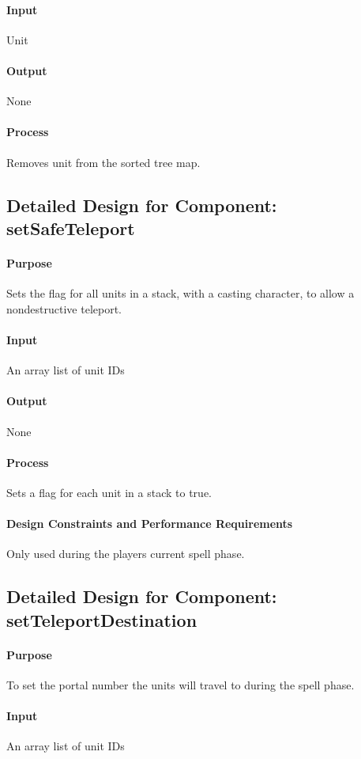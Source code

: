 \documentclass[12pt,a4paper,titlepage]{article}
\begin{document}
\paragraph{Input} Unit
\paragraph{Output} None
\paragraph{Process} Removes unit from the sorted tree map.

\subsection{Detailed Design for Component: setSafeTeleport}
\paragraph{Purpose} Sets the flag for all units in a stack, with a casting character, to allow a nondestructive teleport.
\paragraph{Input} An array list of unit IDs
\paragraph{Output} None
\paragraph{Process} Sets a flag for each unit in a stack to true.
\paragraph{Design Constraints and Performance Requirements} Only used during the players current spell phase.

\subsection{Detailed Design for Component: setTeleportDestination}
\paragraph{Purpose} To set the portal number the units will travel to during the spell phase.
\paragraph{Input} An array list of unit IDs
\end{document}
